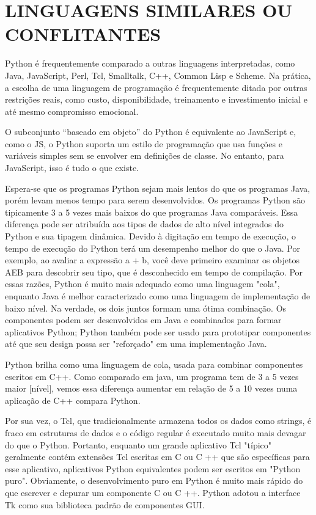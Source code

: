 \chapter{LINGUAGENS SIMILARES OU CONFLITANTES}


Python é frequentemente comparado a outras linguagens interpretadas, como Java, JavaScript, Perl, Tcl, Smalltalk, C++, Common Lisp e Scheme\cite{comparacao}.
Na prática, a escolha de uma linguagem de programação é frequentemente ditada por outras restrições reais, como custo, disponibilidade, treinamento e investimento inicial e até mesmo compromisso emocional.

O subconjunto “baseado em objeto” do Python é equivalente ao JavaScript e, como o JS, o Python suporta um estilo de programação que usa funções e variáveis simples sem se envolver em definições de classe.
No entanto, para JavaScript, isso é tudo o que existe.

Espera-se que os programas Python sejam mais lentos do que os programas Java, porém levam menos tempo para serem desenvolvidos.
Os programas Python são tipicamente 3 a 5 vezes mais baixos do que programas Java comparáveis.
Essa diferença pode ser atribuída aos tipos de dados de alto nível integrados do Python e sua tipagem dinâmica.
Devido à digitação em tempo de execução, o tempo de execução do Python terá um desempenho melhor do que o Java.
Por exemplo, ao avaliar a expressão a + b, você deve primeiro examinar os objetos AEB para descobrir seu tipo, que é desconhecido em tempo de compilação.
Por essas razões, Python é muito mais adequado como uma linguagem "cola", enquanto Java é melhor caracterizado como uma linguagem de implementação de baixo nível.
Na verdade, os dois juntos formam uma ótima combinação.
Os componentes podem ser desenvolvidos em Java e combinados para formar aplicativos Python; Python também pode ser usado para prototipar componentes até que seu design possa ser "reforçado" em uma implementação Java.

Python brilha como uma linguagem de cola, usada para combinar componentes escritos em C++.
Como comparado em java, um programa tem de 3 a 5 vezes maior [nível], vemos essa diferença aumentar em relação de 5 a 10 vezes numa aplicação de C++ compara Python.

Por sua vez, o Tcl, que tradicionalmente armazena todos os dados como strings, é fraco em estruturas de dados e o código regular é executado muito mais devagar do que o Python.
Portanto, enquanto um grande aplicativo Tcl "típico" geralmente contém extensões Tcl escritas em C ou C ++ que são específicas para esse aplicativo, aplicativos Python equivalentes podem ser escritos em "Python puro".
Obviamente, o desenvolvimento puro em Python é muito mais rápido do que escrever e depurar um componente C ou C ++.
Python adotou a interface Tk como sua biblioteca padrão de componentes GUI.

